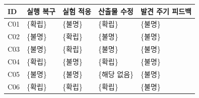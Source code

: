 \begin{tabular}{lp{.20\linewidth}p{.20\linewidth}p{.20\linewidth}p{.20\linewidth}}
\toprule
ID & 실행 복구 & 실험 적응 & 산출물 수정 & 발견 주기 피드백 \\
\midrule
C01 & \{확립\} & \{불명\} & \{확립\} & \{불명\} \\
C02 & \{불명\} & \{확립\} & \{불명\} & \{불명\} \\
C03 & \{불명\} & \{확립\} & \{불명\} & \{불명\} \\
C04 & \{확립\} & \{불명\} & \{확립\} & \{불명\} \\
C05 & \{불명\} & \{불명\} & \{해당 없음\} & \{불명\} \\
C06 & \{확립\} & \{확립\} & \{확립\} & \{불명\} \\
\bottomrule
\end{tabular}
